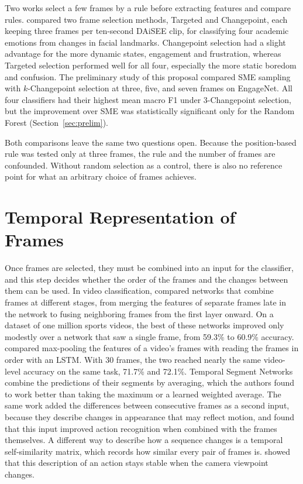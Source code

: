 Two works select a few frames by a rule before extracting features and compare rules.  compared two frame selection methods, Targeted and Changepoint, each keeping three frames per ten-second DAiSEE clip, for classifying four academic emotions from changes in facial landmarks. Changepoint selection had a slight advantage for the more dynamic states, engagement and frustration, whereas Targeted selection performed well for all four, especially the more static boredom and confusion. The preliminary study of this proposal \cite{sityar2026icce} compared SME sampling with $k$-Changepoint selection at three, five, and seven frames on EngageNet. All four classifiers had their highest mean macro F1 under 3-Changepoint selection, but the improvement over SME was statistically significant only for the Random Forest (Section~\ref{sec:prelim}).

Both comparisons leave the same two questions open. Because the position-based rule was tested only at three frames, the rule and the number of frames are confounded. Without random selection as a control, there is also no reference point for what an arbitrary choice of frames achieves.



\section{Temporal Representation of Frames}
\label{sec:rw-temporal}

Once frames are selected, they must be combined into an input for the classifier, and this step decides whether the order of the frames and the changes between them can be used. In video classification,  compared networks that combine frames at different stages, from merging the features of separate frames late in the network to fusing neighboring frames from the first layer onward. On a dataset of one million sports videos, the best of these networks improved only modestly over a network that saw a single frame, from 59.3\% to 60.9\% accuracy.  compared max-pooling the features of a video's frames with reading the frames in order with an LSTM. With 30 frames, the two reached nearly the same video-level accuracy on the same task, 71.7\% and 72.1\%. Temporal Segment Networks \cite{wang2016} combine the predictions of their segments by averaging, which the authors found to work better than taking the maximum or a learned weighted average. The same work added the differences between consecutive frames as a second input, because they describe changes in appearance that may reflect motion, and found that this input improved action recognition when combined with the frames themselves. A different way to describe how a sequence changes is a temporal self-similarity matrix, which records how similar every pair of frames is.  showed that this description of an action stays stable when the camera viewpoint changes.

